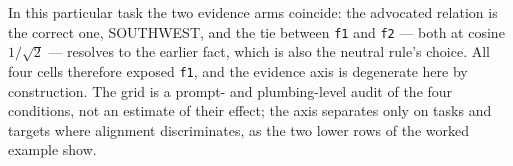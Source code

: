 In this particular task the two evidence arms coincide: the advocated relation
is the correct one, SOUTHWEST, and the tie between \texttt{f1} and \texttt{f2}
--- both at cosine $1/\sqrt{2}$ --- resolves to the earlier fact, which is also
the neutral rule's choice. All four cells therefore exposed \texttt{f1}, and the
evidence axis is degenerate here by construction. The grid is a prompt- and
plumbing-level audit of the four conditions, not an estimate of their effect;
the axis separates only on tasks and targets where alignment discriminates, as
the two lower rows of the worked example show.
